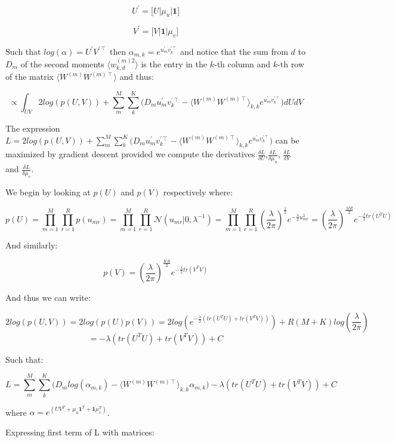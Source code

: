 \documentclass{article}
\begin{document}
$$U^\prime = \bigg[U\bigg|\mu_u\bigg|\textbf{1}\bigg]$$

$$V^\prime = \bigg[V\bigg|\textbf{1}\bigg|\mu_v\bigg]$$

Such that $log(\alpha) = U^\prime V^{\prime \intercal}$ then $\alpha_{m,k} = e^{u^\prime_m v_k^{\prime \intercal}}$ and notice that the sum from $d$ to $D_m$ of the second moments $\langle w_{k,d}^{(m)2}\rangle$ is the entry in the $k$-th column and $k$-th row of the matrix $\langle W^{(m)}W^{(m)\intercal}\rangle$ and thus:

$$\propto \int_{UV}{2log(p(U,V)) + \sum_m^M{\sum_k^K{\Big(D_m u^\prime_m v_k^{\prime \intercal} - \langle W^{(m)}W^{(m)\intercal}\rangle_{k,k}e^{u^\prime_m v_k^{\prime \intercal}}  \Big) }}dUdV}$$

The expression $L = 2log(p(U,V)) + \sum_m^M{\sum_k^K{\Big(D_m u^\prime_m v_k^{\prime \intercal} - \langle W^{(m)}W^{(m)\intercal}\rangle_{k,k}e^{u^\prime_m v_k^{\prime \intercal}}  \Big) }}$ can be maximized by gradient descent provided we compute the derivatives $\frac{\delta L}{\delta U}$,$\frac{\delta L}{\delta \mu_u}$, $\frac{\delta L}{\delta V}$ and $\frac{\delta L}{\delta \mu_v}$.

\bigskip

We begin by looking at $p(U)$ and $p(V)$ respectively where:

$$p(U) = \prod_{m=1}^M \prod_{r=1}^R p(u_{mr}) = \prod_{m=1}^M \prod_{r=1}^R \mathcal{N}(u_{mr}|0,\lambda^{-1}) = \prod_{m=1}^M \prod_{r=1}^R (\frac{\lambda}{2\pi})^{\frac{1}{2}}e^{-\frac{\lambda}{2}u_{mr}^2} = (\frac{\lambda}{2\pi})^{\frac{MR}{2}}e^{-\frac{\lambda}{2}tr(U^TU)}$$

And similarly:

$$p(V) = (\frac{\lambda}{2\pi})^{\frac{KR}{2}}e^{-\frac{\lambda}{2}tr(V^TV)}$$

And thus we can write:

$$2log(p(U,V)) = 2log(p(U) p(V)) = 2log(e^{-\frac{\lambda}{2}(tr(U^TU)+tr(V^TV))}) + R(M+K) log(\frac{\lambda}{2\pi})$$
$$ =  -\lambda (tr(U^TU)+tr(V^TV)) + C$$

Such that:

$$L = \sum_m^M{\sum_k^K{\Big(D_m log(\alpha_{m,k}) - \langle W^{(m)}W^{(m)\intercal}\rangle_{k,k}\alpha_{m,k} \Big) }}-\lambda (tr(U^TU)+tr(V^TV)) + C$$

where $\alpha = e^{(UV^T+\mu_u\textbf{1}^T+\textbf{1}\mu_v^T)}$.

\bigskip

Expressing first term of L with matrices:
\end{document}
